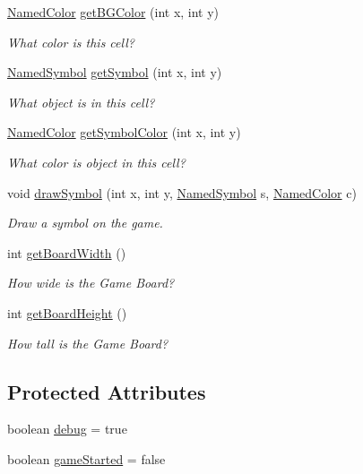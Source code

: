\begin{DoxyCompactItemize}
\hyperlink{enumbridges_1_1base_1_1_named_color}{Named\+Color} \hyperlink{classbridges_1_1games_1_1_game_base_a516920ad24fefd3118757f0c631b774f}{get\+B\+G\+Color} (int x, int y)
\begin{DoxyCompactList}\small\item\em What color is this cell? \end{DoxyCompactList}\item 
\hyperlink{enumbridges_1_1base_1_1_named_symbol}{Named\+Symbol} \hyperlink{classbridges_1_1games_1_1_game_base_ad7c48a1551044b5f2d0357448cdd3124}{get\+Symbol} (int x, int y)
\begin{DoxyCompactList}\small\item\em What object is in this cell? \end{DoxyCompactList}\item 
\hyperlink{enumbridges_1_1base_1_1_named_color}{Named\+Color} \hyperlink{classbridges_1_1games_1_1_game_base_a07d351db46d88b49471baa68eed23e54}{get\+Symbol\+Color} (int x, int y)
\begin{DoxyCompactList}\small\item\em What color is object in this cell? \end{DoxyCompactList}\item 
void \hyperlink{classbridges_1_1games_1_1_game_base_a7dd4caecd0522dcf7fc275517fbc695d}{draw\+Symbol} (int x, int y, \hyperlink{enumbridges_1_1base_1_1_named_symbol}{Named\+Symbol} s, \hyperlink{enumbridges_1_1base_1_1_named_color}{Named\+Color} c)
\begin{DoxyCompactList}\small\item\em Draw a symbol on the game. \end{DoxyCompactList}\item 
int \hyperlink{classbridges_1_1games_1_1_game_base_a33018840a6f19eb54ef27e55231871f5}{get\+Board\+Width} ()
\begin{DoxyCompactList}\small\item\em How wide is the Game Board? \end{DoxyCompactList}\item 
int \hyperlink{classbridges_1_1games_1_1_game_base_a1effb2a789eb19eb81dec64f25be233e}{get\+Board\+Height} ()
\begin{DoxyCompactList}\small\item\em How tall is the Game Board? \end{DoxyCompactList}\end{DoxyCompactItemize}
\subsection*{Protected Attributes}
\begin{DoxyCompactItemize}
\item 
boolean \hyperlink{classbridges_1_1games_1_1_game_base_acfe2d7adaeac12868e8f4541a6458c26}{debug} = true
\item 
boolean \hyperlink{classbridges_1_1games_1_1_game_base_a762327b538bd37afc7ca58e10f15a42c}{game\+Started} = false
\end{DoxyCompactItemize}


